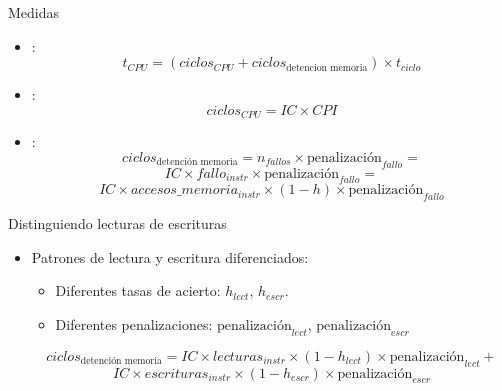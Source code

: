 \begin{frame}[t]{Medidas}
\begin{itemize}
  \item {}:
\[
t_{CPU} = 
\left( ciclos_{CPU} + ciclos_{\text{detencion memoria}} \right) \times t_{ciclo}
\]

  \item {}:
\[
ciclos_{CPU} =
IC \times CPI
\]

  \item {}:
\[
ciclos_{\text{detención memoria}} =
n_{fallos} \times \text{penalización}_{fallo}=
\]
\[
IC \times fallo_{instr} \times \text{penalización}_{fallo} =
\]
\[
IC \times accesos\_memoria_{instr} \times (1 - h ) \times \text{penalización}_{fallo}
\]
\end{itemize}
\end{frame}

\begin{frame}[t]{Distinguiendo lecturas de escrituras}
\begin{itemize}
  \item Patrones de lectura y escritura diferenciados:
    \begin{itemize}
      \item Diferentes tasas de acierto: $h_{lect}$, $h_{escr}$.
      \item Diferentes penalizaciones: $\text{penalización}_{lect}$, $\text{penalización}_{escr}$
    \end{itemize}

\[
ciclos_{\text{detención memoria}} =
IC \times lecturas_{instr} \times (1 - h_{lect}) \times \text{penalización}_{lect} +
\]
\[
IC \times escrituras_{instr} \times (1 - h_{escr}) \times \text{penalización}_{escr}
\]
\end{itemize}
\end{frame}
